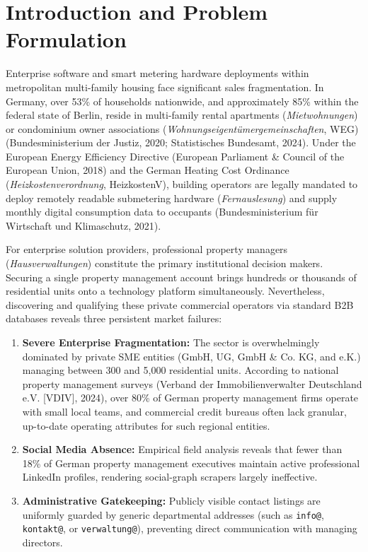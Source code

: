 \documentclass[11pt,a4paper]{article}
\begin{document}
\section{Introduction and Problem Formulation}
Enterprise software and smart metering hardware deployments within metropolitan multi-family housing face significant sales fragmentation. In Germany, over 53\% of households nationwide, and approximately 85\% within the federal state of Berlin, reside in multi-family rental apartments (\textit{Mietwohnungen}) or condominium owner associations (\textit{Wohnungseigent\"umergemeinschaften}, WEG) (Bundesministerium der Justiz, 2020; Statistisches Bundesamt, 2024). Under the European Energy Efficiency Directive (European Parliament \& Council of the European Union, 2018) and the German Heating Cost Ordinance (\textit{Heizkostenverordnung}, HeizkostenV), building operators are legally mandated to deploy remotely readable submetering hardware (\textit{Fernauslesung}) and supply monthly digital consumption data to occupants (Bundesministerium f\"ur Wirtschaft und Klimaschutz, 2021).

For enterprise solution providers, professional property managers (\textit{Hausverwaltungen}) constitute the primary institutional decision makers. Securing a single property management account brings hundreds or thousands of residential units onto a technology platform simultaneously. Nevertheless, discovering and qualifying these private commercial operators via standard B2B databases reveals three persistent market failures:
\begin{enumerate}
    \item \textbf{Severe Enterprise Fragmentation:} The sector is overwhelmingly dominated by private SME entities (GmbH, UG, GmbH \& Co. KG, and e.K.) managing between 300 and 5,000 residential units. According to national property management surveys (Verband der Immobilienverwalter Deutschland e.V. [VDIV], 2024), over 80\% of German property management firms operate with small local teams, and commercial credit bureaus often lack granular, up-to-date operating attributes for such regional entities.
    \item \textbf{Social Media Absence:} Empirical field analysis reveals that fewer than 18\% of German property management executives maintain active professional LinkedIn profiles, rendering social-graph scrapers largely ineffective.
    \item \textbf{Administrative Gatekeeping:} Publicly visible contact listings are uniformly guarded by generic departmental addresses (such as \texttt{info@}, \texttt{kontakt@}, or \texttt{verwaltung@}), preventing direct communication with managing directors.
\end{enumerate}
\end{document}
